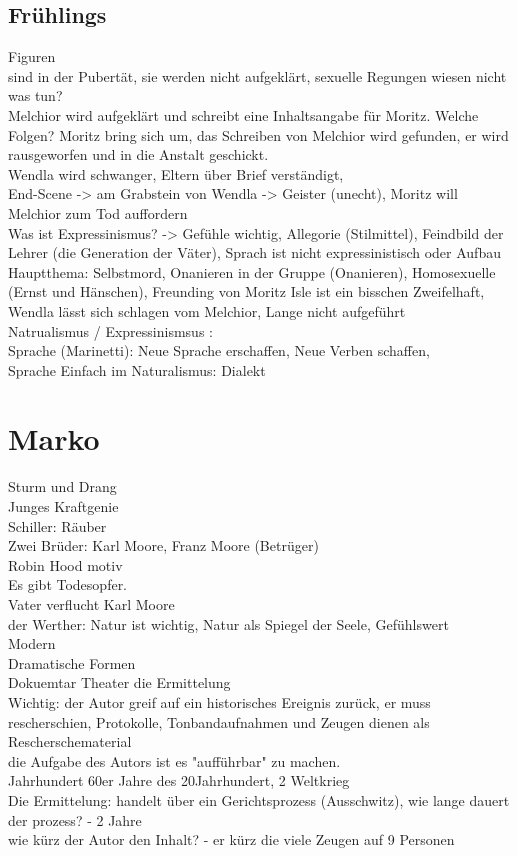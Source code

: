 \documentclass[a4paper]{article}
\begin{document}
\subsection{Frühlings}

Figuren\\ 
sind in der Pubertät, sie werden nicht aufgeklärt, sexuelle Regungen wiesen nicht was tun?\\
Melchior wird aufgeklärt und schreibt eine Inhaltsangabe für Moritz. Welche Folgen? Moritz bring sich um, das Schreiben von Melchior wird gefunden, er wird rausgeworfen und in die Anstalt geschickt.\\
Wendla wird schwanger, Eltern über Brief verständigt,\\
End-Scene -> am Grabstein von Wendla -> Geister (unecht), Moritz will Melchior zum Tod auffordern\\

Was ist Expressinismus? -> Gefühle wichtig, Allegorie (Stilmittel), Feindbild der Lehrer (die Generation der Väter), Sprach ist nicht expressinistisch oder Aufbau\\
Hauptthema: Selbstmord, Onanieren in der Gruppe (Onanieren), Homosexuelle (Ernst und Hänschen), Freunding von Moritz Isle ist ein bisschen Zweifelhaft, Wendla lässt sich schlagen vom Melchior, Lange nicht aufgeführt\\

Natrualismus / Expressinismsus :\\
Sprache (Marinetti): Neue Sprache erschaffen, Neue Verben schaffen,\\ 
Sprache Einfach im Naturalismus: Dialekt

\section{Marko}
Sturm und Drang\\
Junges Kraftgenie\\
Schiller: Räuber\\
Zwei Brüder: Karl Moore, Franz Moore (Betrüger)\\
Robin Hood motiv\\
Es gibt Todesopfer.\\
Vater verflucht Karl Moore\\
der Werther: Natur ist wichtig, Natur als Spiegel der Seele, Gefühlswert\\
Modern\\
Dramatische Formen\\
Dokuemtar Theater die Ermittelung\\
Wichtig: der Autor greif auf ein historisches Ereignis zurück, er muss rescherschien, Protokolle, Tonbandaufnahmen und Zeugen dienen als Rescherschematerial\\
die Aufgabe des Autors ist es "aufführbar" zu machen.\\
Jahrhundert 60er Jahre des 20Jahrhundert, 2 Weltkrieg\\
Die Ermittelung: handelt über ein Gerichtsprozess (Ausschwitz), wie lange dauert der prozess? - 2 Jahre\\
wie kürz der Autor den Inhalt? - er kürz die viele Zeugen auf 9 Personen
\end{document}
